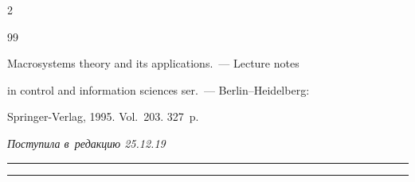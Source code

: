 \begin{multicols}{2}
{{\begin{thebibliography}{99}


 Macrosystems theory and its applications.~--- Lecture notes 


in control and information sciences ser.~--- Berlin--Heidelberg: 


Springer-Verlag, 1995. Vol.~203. 327~p.





\end{thebibliography}





 }


 }





\end{multicols}





\vspace*{-6pt}





\hfill{\small\textit{Поступила в~редакцию 25.12.19}}





\vspace*{7pt}




















\hrule





\vspace*{2pt}





\hrule










